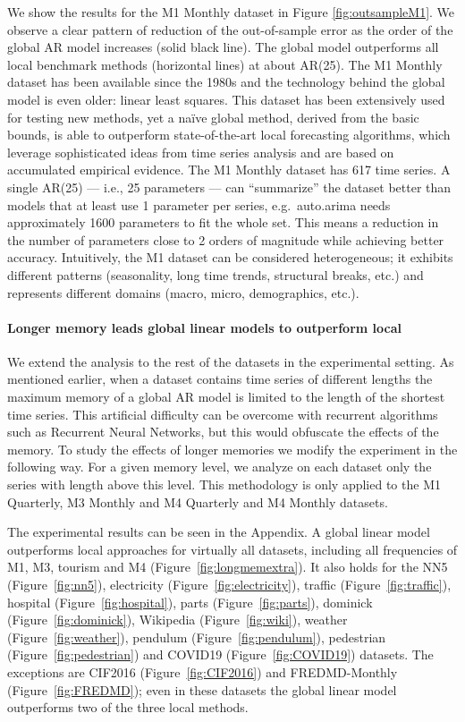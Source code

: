 \documentclass[a4paper]{article}
\theoremstyle{custom}
\begin{document}
We show the results for the M1 Monthly dataset in Figure \ref{fig:outsampleM1}.
We observe a clear pattern of reduction of the out-of-sample error as the order of the global AR model increases (solid black line).
The global model outperforms all local benchmark methods (horizontal lines) at about AR(25).
The M1 Monthly dataset has been available since the 1980s and the technology behind the global model is even older: linear least squares.
This dataset has been extensively used for testing new methods, yet a naïve global method, derived from the basic bounds, is able to outperform state-of-the-art local forecasting algorithms, which leverage sophisticated ideas from time series analysis and are based on accumulated empirical evidence.
The M1 Monthly dataset has 617 time series.
A single AR(25) --- i.e., 25 parameters --- can ``summarize'' the dataset better than models that at least use 1 parameter per series, e.g.\ auto.arima needs approximately 1600 parameters to fit the whole set.
This means a reduction in the number of parameters close to 2 orders of magnitude while achieving better accuracy.
Intuitively, the M1 dataset can be considered heterogeneous; it exhibits different patterns (seasonality, long time trends, structural breaks, etc.) and represents different domains (macro, micro, demographics, etc.).

\paragraph{Longer memory leads global linear models to outperform local}

We extend the analysis to the rest of the datasets in the experimental setting.
As mentioned earlier, when a dataset contains time series of different lengths the maximum memory of a global AR model is limited to the length of the shortest time series. This artificial difficulty can be overcome with recurrent algorithms such as Recurrent Neural Networks, but this would obfuscate the effects of the memory. To study the effects of longer memories we modify the experiment in the following way.
For a given memory level, we analyze on each dataset only the series with length above this level. This methodology is only applied to the M1 Quarterly, M3 Monthly and M4 Quarterly and M4 Monthly datasets.

The experimental results can be seen in the Appendix\@. A global linear model outperforms local approaches for virtually all datasets, including all frequencies of M1, M3, tourism and M4 (Figure~\ref{fig:longmemextra}).
It also holds for the NN5 (Figure~\ref{fig:nn5}), electricity (Figure~\ref{fig:electricity}), traffic (Figure~\ref{fig:traffic}), hospital (Figure~\ref{fig:hospital}), parts (Figure~\ref{fig:parts}), dominick  (Figure~\ref{fig:dominick}), Wikipedia  (Figure~\ref{fig:wiki}), weather  (Figure~\ref{fig:weather}), pendulum (Figure~\ref{fig:pendulum}), pedestrian (Figure~\ref{fig:pedestrian}) and COVID19 (Figure~\ref{fig:COVID19}) datasets.
The exceptions are CIF2016 (Figure~\ref{fig:CIF2016}) and FREDMD-Monthly (Figure~\ref{fig:FREDMD}); even in these datasets the global linear model outperforms two of the three local methods.
\end{document}
